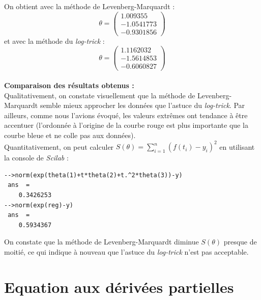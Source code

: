 \documentclass[a4paper,10pt]{report}
\begin{document}
On obtient avec la méthode de Levenberg-Marquardt :
\abovedisplayskip=0mm
\begin{displaymath}
\theta= \left( \begin{array}{c} 1.009355 \\ - 1.0541773 \\ - 0.9301856 \end{array} \right)
\end{displaymath}
et avec la méthode du \textit{log-trick} :
\abovedisplayskip=0mm
\begin{displaymath}
\theta= \left( \begin{array}{c} 1.1162032 \\ - 1.5614853 \\ - 0.6060827 \end{array} \right)
\end{displaymath} \\
\textbf{Comparaison des résultats obtenus :}\\
Qualitativement, on constate visuellement que la méthode de Levenberg-Marquardt semble mieux approcher les données que l'astuce du \textit{log-trick}. Par ailleurs, comme nous l'avions évoqué, les valeurs extrêmes ont tendance à être accentuer (l'ordonnée à l'origine de  la courbe rouge est plus importante que la courbe bleue et ne colle pas aux données).\\
Quantitativement, on peut calculer $S(\theta)=\sum \limits_{i=1}^n (f(t_i)-y_i)^2$ en utilisant la console de \textit{Scilab} :
\begin{verbatim}
-->norm(exp(theta(1)+t*theta(2)+t.^2*theta(3))-y)
 ans  =
    0.3426253 
-->norm(exp(reg)-y)
 ans  =
    0.5934367  
\end{verbatim}
On constate que la méthode de Levenberg-Marquardt diminue $S(\theta)$ presque de moitié, ce qui indique à nouveau que l'astuce du \textit{log-trick} n'est pas acceptable.

\chapter{Equation aux dérivées partielles}
\end{document}
